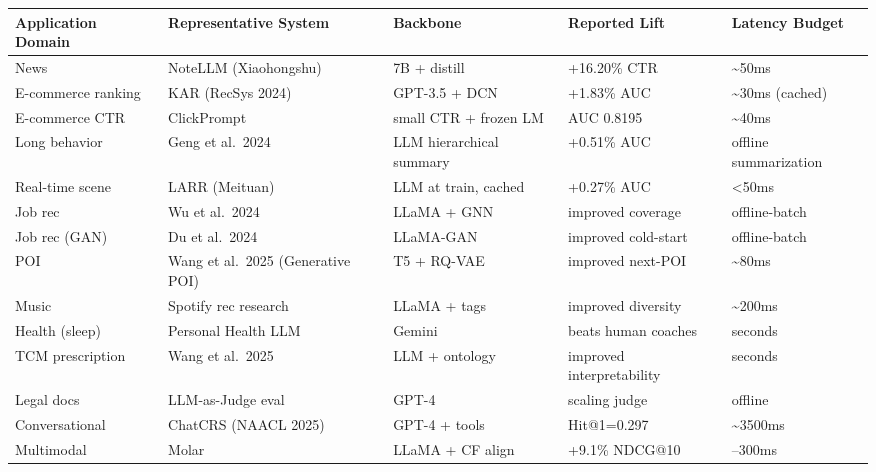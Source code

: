 {\def\LTcaptype{none} %
\begin{longtable}[]{@{}
  >{\raggedright\arraybackslash}p{}
  >{\raggedright\arraybackslash}p{}
  >{\raggedright\arraybackslash}p{}
  >{\raggedright\arraybackslash}p{}
  >{\raggedright\arraybackslash}p{}@{}}
\toprule\noalign{}
\begin{minipage}[b]{\linewidth}\raggedright
Application Domain
\end{minipage} & \begin{minipage}[b]{\linewidth}\raggedright
Representative System
\end{minipage} & \begin{minipage}[b]{\linewidth}\raggedright
Backbone
\end{minipage} & \begin{minipage}[b]{\linewidth}\raggedright
Reported Lift
\end{minipage} & \begin{minipage}[b]{\linewidth}\raggedright
Latency Budget
\end{minipage} \\
\midrule\noalign{}
\endhead
\bottomrule\noalign{}
\endlastfoot
News & NoteLLM (Xiaohongshu) & 7B + distill & +16.20\% CTR & \textasciitilde50ms \\
E-commerce ranking & KAR (RecSys 2024) & GPT-3.5 + DCN & +1.83\% AUC & \textasciitilde30ms (cached) \\
E-commerce CTR & ClickPrompt & small CTR + frozen LM & AUC 0.8195 & \textasciitilde40ms \\
Long behavior & Geng et al.~2024 & LLM hierarchical summary & +0.51\% AUC & offline summarization \\
Real-time scene & LARR (Meituan) & LLM at train, cached & +0.27\% AUC & \textless50ms \\
Job rec & Wu et al.~2024 & LLaMA + GNN & improved coverage & offline-batch \\
Job rec (GAN) & Du et al.~2024 & LLaMA-GAN & improved cold-start & offline-batch \\
POI & Wang et al.~2025 (Generative POI) & T5 + RQ-VAE & improved next-POI & \textasciitilde80ms \\
Music & Spotify rec research & LLaMA + tags & improved diversity & \textasciitilde200ms \\
Health (sleep) & Personal Health LLM & Gemini & beats human coaches & seconds \\
TCM prescription & Wang et al.~2025 & LLM + ontology & improved interpretability & seconds \\
Legal docs & LLM-as-Judge eval & GPT-4 & scaling judge & offline \\
Conversational & ChatCRS (NAACL 2025) & GPT-4 + tools & Hit@1=0.297 & \textasciitilde3500ms \\
Multimodal & Molar & LLaMA + CF align & +9.1\% NDCG@10 & 100--300ms \\
\end{longtable}
}

